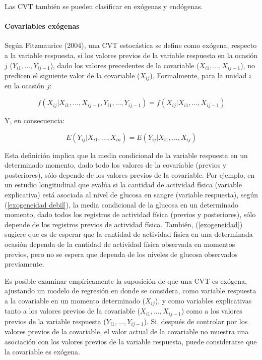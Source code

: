 \documentclass[spanish]{article}
\numberwithin{figure}{subsection}
\numberwithin{equation}{subsection}
\numberwithin{table}{subsection}
\begin{document}
Las CVT también se pueden clasificar en exógenas y endógenas.

\paragraph{Covariables exógenas} \mbox{}

Según Fitzmaurice (2004), una CVT estocástica se define como exógena, respecto a
la variable respuesta, si los valores previos de la variable respuesta en la
ocasión $j$ ($Y_{i1}, ..., Y_{ij-1}$), dado los valores precedentes de la
covariable ($X_{i1}, ..., X_{ij-1}$), no predicen el siguiente valor de la
covariable ($X_{ij}$). Formalmente, para la unidad $i$ en la ocasión $j$:  

\begin{equation}
	\label{exogeneidad}
	f(X_{ij}|X_{i1}, ..., X_{ij-1}, Y_{i1}, ..., Y_{ij-1}) =
	f(X_{ij}|X_{i1}, ..., X_{ij-1})
\end{equation}

Y, en consecuencia:

\begin{equation}
	\label{exogeneidad debil}
	E(Y_{ij}|X_{i1}, ..., X_{in}) = E(Y_{ij}|X_{i1}, ..., X_{ij})
\end{equation}

Esta definición implica que la media condicional de la variable respuesta en un
determinado momento, dado todo los valores de la covariable (previos y
posteriores), sólo depende de los valores previos de la covariable. Por ejemplo,
en un estudio longitudinal que evalúa si la cantidad de actividad física
(variable explicativa) está asociada al nivel de glucosa en sangre (variable
respuesta), según (\ref{exogeneidad debil}), la media condicional de la glucosa
en un determinado momento, dado todos los registros de actividad física (previos
y posteriores), sólo depende de los registros previos de actividad física.
También, (\ref{exogeneidad}) sugiere que es de esperar que la cantidad de
actividad física en una determinada ocasión dependa de la cantidad de actividad
física observada en momentos previos, pero no se espera que dependa de los niveles
de glucosa observados previamente.

Es posible examinar empíricamente la suposición de que una CVT es exógena,
ajustando un modelo de regresión en donde se considera, como variable respuesta
a la covariable en un momento determinado ($X_{ij}$), y como variables
explicativas tanto a los valores previos de la covariable ($X_{i1}, ...,
X_{ij-1}$) como a los valores previos de la variable respuesta ($Y_{i1}, ...,
Y_{ij-1}$). Si, después de controlar por los valores previos de la covariable,
el valor actual de la covariable no muestra una asociación con los valores
previos de la variable respuesta, puede considerarse que la covariable es
exógena.
\end{document}
